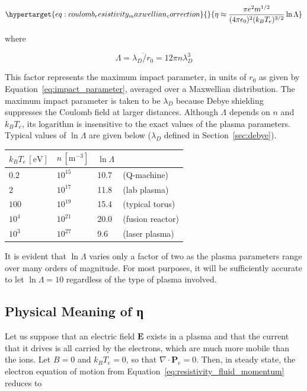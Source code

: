 \documentclass[
  notoc %
]{tufte-book}
\begin{document}
\begin{equation}\protect\hypertarget{eq:coulomb_resistivity_maxwellian_correction}{}{
\eta\approx\frac{\pi e^2m^{1/2}}{(4\pi\epsilon_0)^2 (k_B T_e)^{3/2}}\ln\Lambda
}\label{eq:coulomb_resistivity_maxwellian_correction}\end{equation}

where

\[
\Lambda = \overline{\lambda_D/r_0} = 12\pi n\lambda_D^3
\]

This factor represents the maximum impact parameter, in units of \(r_0\)
as given by Equation~\ref{eq:impact_parameter}, averaged over a
Maxwellian distribution. The maximum impact parameter is taken to be
\(\lambda_D\) because Debye shielding suppresses the Coulomb field at
larger distances. Although \(\Lambda\) depends on \(n\) and \(k_BT_e\),
its logarithm is insensitive to the exact values of the plasma
parameters. Typical values of \(\ln \Lambda\) are given below
(\(\lambda_D\) defined in Section~\ref{sec:debye}).

\begin{longtable}[]{@{}llll@{}}
\toprule
\(k_B T_e\,[\text{eV}]\) & \(n\,[\text{m}^{-3}]\) & \(\ln\Lambda\) & \\
\midrule
\endhead
\(0.2\) & \(10^{15}\) & 10.7 & (Q-machine) \\
\(2\) & \(10^{17}\) & 11.8 & (lab plasma) \\
\(100\) & \(10^{19}\) & 15.4 & (typical torus) \\
\(10^4\) & \(10^{21}\) & 20.0 & (fusion reactor) \\
\(10^3\) & \(10^{27}\) & 9.6 & (laser plasma) \\
\bottomrule
\end{longtable}

It is evident that \(\ln \Lambda\) varies only a factor of two as the
plasma parameters range over many orders of magnitude. For most
purposes, it will be sufficiently accurate to let \(\ln \Lambda=10\)
regardless of the type of plasma involved.

\hypertarget{physical-meaning-of-ux3b7}{%
\subsection{Physical Meaning of η}\label{physical-meaning-of-ux3b7}}

Let us suppose that an electric field \(\mathbf{E}\) exists in a plasma
and that the current that it drives is all carried by the electrons,
which are much more mobile than the ions. Let \(B=0\) and \(k_BT_e=0\),
so that \(\nabla\cdot\mathbf{P}_e=0\). Then, in steady state, the
electron equation of motion from
Equation~\ref{eq:resistivity_fluid_momentum} reduces to
\end{document}
